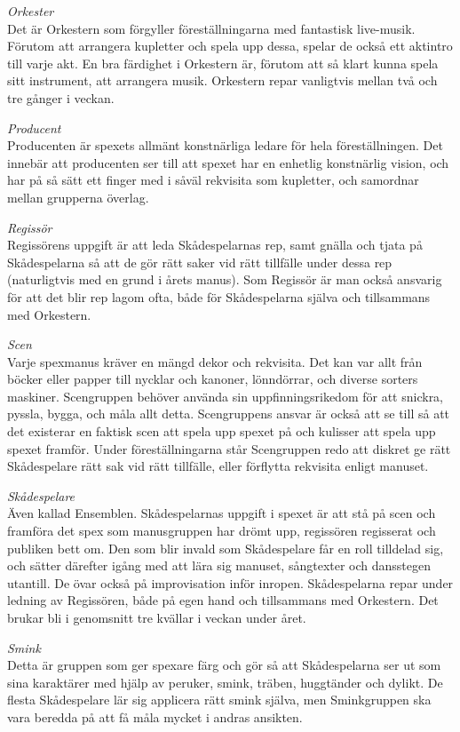 {\Large\textit{Orkester}} \\
Det är Orkestern som förgyller föreställningarna med fantastisk live-musik. Förutom att arrangera kupletter och spela upp dessa, spelar de också ett aktintro till varje akt. En bra färdighet i Orkestern är, förutom att så klart kunna spela sitt instrument, att arrangera musik. Orkestern repar vanligtvis mellan två och tre gånger i veckan.


{\Large\textit{Producent}} \\
Producenten är spexets allmänt konstnärliga ledare för hela föreställningen. Det innebär att producenten ser till att spexet har en enhetlig konstnärlig vision, och har på så sätt ett finger med i såväl rekvisita som kupletter, och samordnar mellan grupperna överlag.


{\Large\textit{Regissör}} \\
Regissörens uppgift är att leda Skådespelarnas rep, samt gnälla och tjata på Skådespelarna så att de gör rätt saker vid rätt tillfälle under dessa rep (naturligtvis med en grund i årets manus). Som Regissör är man också ansvarig för att det blir rep lagom ofta, både för Skådespelarna själva och tillsammans med Orkestern.


{\Large\textit{Scen}} \\
Varje spexmanus kräver en mängd dekor och rekvisita. Det kan var allt från böcker eller papper till nycklar och kanoner, lönndörrar, och diverse sorters maskiner. Scengruppen
behöver använda sin uppfinningsrikedom för att snickra, pyssla, bygga, och måla allt detta. Scengruppens ansvar är också att se till så att det existerar en faktisk scen att spela upp spexet på och kulisser att spela upp spexet framför. Under föreställningarna står Scengruppen redo att diskret ge rätt Skådespelare rätt sak vid rätt tillfälle, eller förflytta
rekvisita enligt manuset.

{\Large\textit{Skådespelare}} \\
Även kallad Ensemblen. Skådespelarnas uppgift i spexet är att stå på scen och framföra det spex som manusgruppen har drömt upp, regissören regisserat och publiken bett om. Den som blir invald som Skådespelare får en roll tilldelad sig, och sätter därefter igång med att lära sig manuset, sångtexter och dansstegen utantill. De övar också på improvisation inför inropen. Skådespelarna repar under ledning av Regissören, både på egen hand och tillsammans med Orkestern. Det brukar bli i genomsnitt tre kvällar i veckan under året.


{\Large\textit{Smink}} \\
Detta är gruppen som ger spexare färg och gör så att Skådespelarna ser ut som sina karaktärer med hjälp av peruker, smink, träben, huggtänder och dylikt. De flesta Skådespelare lär sig applicera rätt smink själva, men Sminkgruppen ska vara beredda på att få måla mycket i andras ansikten.

